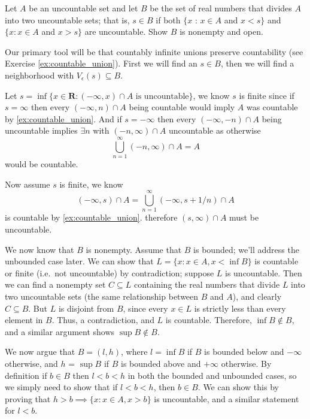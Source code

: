 \begin{exercise}
  Let $A$ be an uncountable set and let $B$ be the set of real numbers that divides $A$ into two uncountable sets; that is, $s \in B$ if both $\{x$ : $x \in A$ and $x<s\}$ and $\{x: x \in A$ and $x>s\}$ are uncountable. Show $B$ is nonempty and open.
\end{exercise}

\begin{solution}
  Our primary tool will be that countably infinite unions preserve countability (see Exercise \ref{ex:countable_union}). First we will find an $s \in B$, then we will find a neighborhood with $V_\epsilon(s) \subseteq B$.

  Let $s = \inf \{x \in \mathbf{R} : (-\infty, x) \cap A \text{ is uncountable}\}$, we know $s$ is finite since if $s = \infty$ then every $(-\infty, n) \cap A$ being countable would imply $A$ was countable by \ref{ex:countable_union}.
  And if $s = -\infty$ then every $(-\infty, -n) \cap A$ being uncountable implies $\exists n$ with $(-n, \infty) \cap A$ uncountable as otherwise
  $$
  \bigcup_{n=1}^\infty (-n, \infty) \cap A = A
  $$
  would be countable.

  Now assume $s$ is finite, we know
  $$(-\infty, s) \cap A = \bigcup_{n=1}^\infty (-\infty, s+1/n) \cap A$$
  is countable by \ref{ex:countable_union}. therefore $(s, \infty) \cap A$ must be uncountable.

  We now know that \(B\) is nonempty. Assume that \(B\) is bounded; we'll address the unbounded case later. We can show that \(L= \{x: x \in A, x < \inf B\}\) is countable or finite (i.e.\ not uncountable) by contradiction; suppose \(L\) is uncountable. Then we can find a nonempty set \(C \subseteq L\) containing the real numbers that divide \(L\) into two uncountable sets (the same relationship between \(B\) and \(A\)), and clearly \(C \subseteq B\). But \(L\) is disjoint from \(B\), since every \(x \in L\) is strictly less than every element in \(B\). Thus, a contradiction, and \(L\) is countable. Therefore, \(\inf B \notin B\), and a similar argument shows \(\sup B \notin B\).

  We now argue that \(B = (l, h)\), where \(l = \inf B\) if \(B\) is bounded below and \(-\infty\) otherwise, and \(h\) = \(\sup B\) if \(B\) is bounded above and \(+\infty\) otherwise. By definition if \(b \in B\) then \(l < b < h\) in both the bounded and unbounded cases, so we simply need to show that if \(l < b < h\), then \(b \in B\). We can show this by proving that \(h > b \implies \{x : x \in A, x > b\}\) is uncountable, and a similar statement for \(l < b\).


\end{solution}
